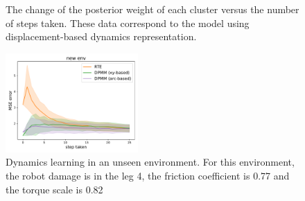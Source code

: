 \documentclass[journal]{IEEEtran}
\begin{document}
\begin{figure}[!t]
\centering
{}
{}
\caption{The change of the posterior weight of each cluster versus the number of steps taken.
These data correspond to the model using displacement-based dynamics representation.
}
\label{weights}
\end{figure}

\begin{figure}[h]
\centering
\includegraphics[width=0.45\textwidth]{regular_case4.pdf}
\caption{Dynamics learning in an unseen environment.
For this environment, the robot damage is in the leg 4, the friction coefficient is 0.77 and the torque scale is 0.82}
\label{new_env}
\end{figure}
\end{document}
